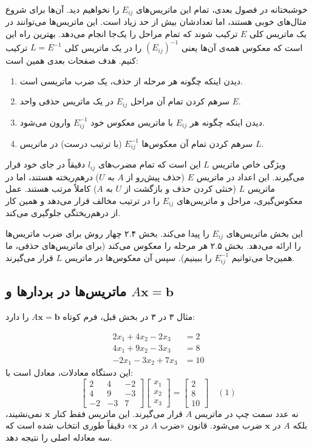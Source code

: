 \documentclass[12pt, a4paper]{book}
\begin{document}
	خوشبختانه در فصول بعدی، تمام این ماتریس‌های $E_{ij}$ را نخواهیم دید. آن‌ها برای شروع مثال‌های خوبی هستند، اما تعدادشان بیش از حد زیاد است. این ماتریس‌ها می‌توانند در یک ماتریس کلی $E$ ترکیب شوند که تمام مراحل را یک‌جا انجام می‌دهد. بهترین راه این است که معکوس همه‌ی آن‌ها یعنی $(E_{ij})^{-1}$ را در یک ماتریس کلی $L = E^{-1}$ ترکیب کنیم. هدف صفحات بعدی همین است:
	
	\begin{enumerate}
		\item دیدن اینکه چگونه هر مرحله از حذف، یک ضرب ماتریسی است.
		\item سرهم کردن تمام آن مراحل $E_{ij}$ در یک ماتریس حذفی واحد $E$.
		\item دیدن اینکه چگونه هر $E_{ij}$ با ماتریس معکوس خود $E_{ij}^{-1}$ وارون می‌شود.
		\item سرهم کردن تمام آن معکوس‌ها $E_{ij}^{-1}$ (با ترتیب درست) در ماتریس $L$.
	\end{enumerate}
	
	ویژگی خاص ماتریس $L$ این است که تمام مضرب‌های $l_{ij}$ دقیقاً در جای خود قرار می‌گیرند. این اعداد در ماتریس $E$ (حذف پیش‌رو از $A$ به $U$) درهم‌ریخته هستند، اما در ماتریس $L$ (خنثی کردن حذف و بازگشت از $U$ به $A$) کاملاً مرتب هستند. عمل معکوس‌گیری، مراحل و ماتریس‌های $E_{ij}$ را در ترتیب مخالف قرار می‌دهد و همین کار از درهم‌ریختگی جلوگیری می‌کند.
	
	این بخش ماتریس‌های $E_{ij}$ را پیدا می‌کند. بخش ۲.۴ چهار روش برای ضرب ماتریس‌ها را ارائه می‌دهد. بخش ۲.۵ هر مرحله را معکوس می‌کند (برای ماتریس‌های حذفی، ما همین‌جا می‌توانیم $E_{ij}^{-1}$ را ببینیم). سپس آن معکوس‌ها در ماتریس $L$ قرار می‌گیرند.
	
	\subsection*{ماتریس‌ها در بردارها و $A\mathbf{x}=\mathbf{b}$}
	
	مثال ۳ در ۳ در بخش قبل، فرم کوتاه $A\mathbf{x}=\mathbf{b}$ را دارد:
	
	\begin{align*}
		2x_1 + 4x_2 - 2x_3 &= 2 \\
		4x_1 + 9x_2 - 3x_3 &= 8 \\
		-2x_1 - 3x_2 + 7x_3 &= 10
	\end{align*}
	این دستگاه معادلات، معادل است با:
	\[
	\begin{bmatrix}
		2 & 4 & -2 \\
		4 & 9 & -3 \\
		-2 & -3 & 7
	\end{bmatrix}
	\begin{bmatrix}
		x_1 \\ x_2 \\ x_3
	\end{bmatrix}
	=
	\begin{bmatrix}
		2 \\ 8 \\ 10
	\end{bmatrix} \quad (1)
	\]
	نه عدد سمت چپ در ماتریس $A$ قرار می‌گیرند. این ماتریس فقط کنار $\mathbf{x}$ نمی‌نشیند، بلکه $A$ در $\mathbf{x}$ ضرب می‌شود. قانون «ضرب $A$ در $\mathbf{x}$» دقیقاً طوری انتخاب شده است که سه معادله اصلی را نتیجه دهد.
	
\end{document}
